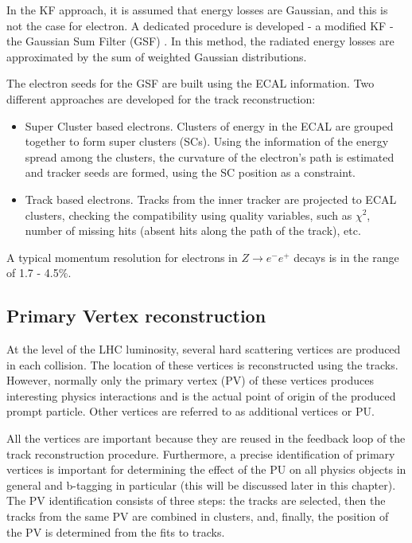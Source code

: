 In the KF approach, it is assumed that energy losses are Gaussian, and this is not the case for electron. A dedicated procedure is developed - a modified KF - the Gaussian Sum Filter (GSF) \cite{GSF}. In this method, the radiated energy losses are approximated by the sum of weighted Gaussian distributions. 

The electron seeds for the GSF are built using the ECAL information. Two different approaches are developed for the track reconstruction:

\begin{itemize}

\item Super Cluster based electrons. Clusters of energy in the ECAL are grouped together to form super clusters (SCs). Using the information of the energy spread among the clusters, the curvature of the electron's path is estimated and tracker seeds are formed, using the SC position as a constraint. 
\item Track based electrons. Tracks from the inner tracker are projected to ECAL clusters, checking the compatibility using quality variables, such as $\chi^2$, number of missing hits (absent hits along the path of the track), etc. 
\end{itemize}

A typical momentum resolution for electrons in $Z \rightarrow e^- e^+$ decays is in the range of 1.7 - 4.5$\%$.

\subsection{Primary Vertex reconstruction}\label{sec:PV_reconstruction}

At the level of the LHC luminosity, several hard scattering vertices are produced in each collision. The location of these vertices is reconstructed using the tracks. However, normally only the primary vertex (PV) of these vertices produces interesting physics interactions and is the actual point of origin of the produced prompt particle. Other vertices are referred to as additional vertices or PU. 

All the vertices are important because they are reused in the feedback loop of the track reconstruction procedure. Furthermore, a precise identification of primary vertices is important for determining the effect of the PU on all physics objects in general and b-tagging in particular (this will be discussed later in this chapter). The PV identification consists of three steps: the tracks are selected, then the tracks from the same PV are combined in clusters, and, finally, the position of the PV is determined from the fits to tracks. 

